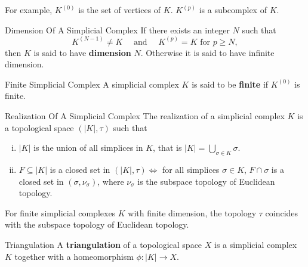 \documentclass{report}
\begin{document}
For example, $K^{(0)}$ is the set of vertices of $K$. $K^{(p)}$ is a subcomplex of $K$.

\begin{definition}{Dimension Of A Simplicial Complex}{}
	If there exists an integer $N$ such that
	$$
		K^{(N-1)} \neq K \quad \text { and } \quad K^{(p)}=K \text { for }p\ge N ,
	$$
	then $K$ is said to have \textbf{dimension} $N$. Otherwise it is said to have infinite dimension.
\end{definition}

\begin{definition}{Finite Simplicial Complex}{}
	A simplicial complex $K$ is said to be \textbf{finite} if $K^{(0)}$ is finite.
\end{definition}


\begin{definition}{Realization Of A Simplicial Complex}{}
	The realization of a simplicial complex $K$ is a topological space $(|K|, \tau)$ such that
	\begin{enumerate}[(i)]
		\item $|K|$ is the union of all simplices in $K$, that is $|K|=\bigcup_{\sigma\in K}\sigma$.
		\item $F\subseteq |K|$ is a closed set in $(|K|, \tau)\iff$ for all simplices $\sigma\in K$, $F\cap \sigma$ is a closed set in $(\sigma,\nu_\sigma)$, where $\nu_\sigma$ is the subspace topology of Euclidean topology.
	\end{enumerate}
\end{definition}

For finite simplicial complexes $K$ with finite dimension, the topology $\tau$ coincides with the subspace topology of Euclidean topology.
\begin{definition}{Triangulation}{}
	A \textbf{triangulation} of a topological space $X$ is a simplicial complex $K$ together with a homeomorphism $\phi:|K|\to X$.
\end{definition}
\end{document}
